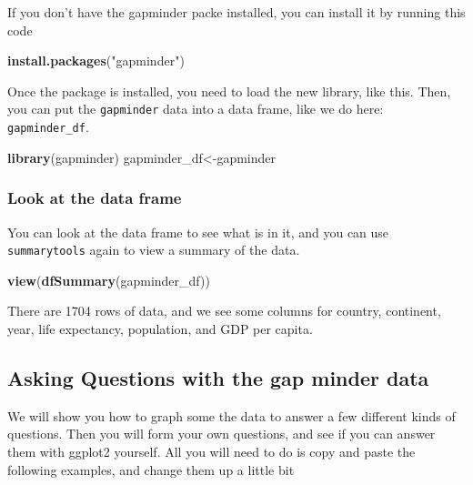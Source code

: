 \documentclass[]{book}
\newenvironment{Shaded}{\begin{snugshade}}{\end{snugshade}}
\newcommand{\KeywordTok}[1]{\textcolor[rgb]{0.13,0.29,0.53}{\textbf{{#1}}}}
\newcommand{\StringTok}[1]{\textcolor[rgb]{0.31,0.60,0.02}{{#1}}}
\newcommand{\NormalTok}[1]{{#1}}
\theoremstyle{definition}
\theoremstyle{definition}
\theoremstyle{definition}
\theoremstyle{remark}
\begin{document}
If you don't have the gapminder packe installed, you can install it by
running this code

\begin{Shaded}
\begin{Highlighting}[]
\KeywordTok{install.packages}\NormalTok{(}\StringTok{"gapminder"}\NormalTok{)}
\end{Highlighting}
\end{Shaded}

Once the package is installed, you need to load the new library, like
this. Then, you can put the \texttt{gapminder} data into a data frame,
like we do here: \texttt{gapminder\_df}.

\begin{Shaded}
\begin{Highlighting}[]
\KeywordTok{library}\NormalTok{(gapminder)}
\NormalTok{gapminder_df<-gapminder}
\end{Highlighting}
\end{Shaded}

\subsubsection{Look at the data frame}\label{look-at-the-data-frame}

You can look at the data frame to see what is in it, and you can use
\texttt{summarytools} again to view a summary of the data.

\begin{Shaded}
\begin{Highlighting}[]
\KeywordTok{view}\NormalTok{(}\KeywordTok{dfSummary}\NormalTok{(gapminder_df))}
\end{Highlighting}
\end{Shaded}

There are 1704 rows of data, and we see some columns for country,
continent, year, life expectancy, population, and GDP per capita.

\subsection{Asking Questions with the gap minder
data}\label{asking-questions-with-the-gap-minder-data}

We will show you how to graph some the data to answer a few different
kinds of questions. Then you will form your own questions, and see if
you can answer them with ggplot2 yourself. All you will need to do is
copy and paste the following examples, and change them up a little bit
\end{document}
